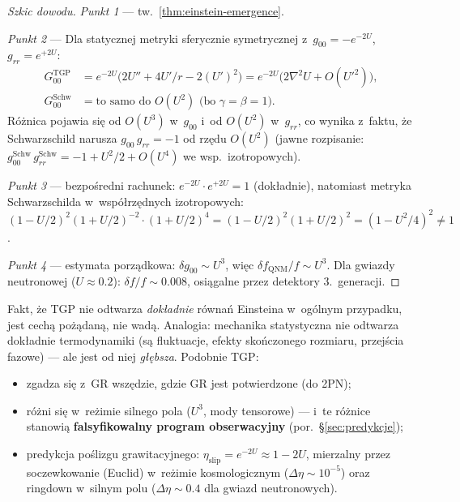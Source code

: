 \begin{proof}[Szkic dowodu]
\emph{Punkt 1} --- tw.~\ref{thm:einstein-emergence}.

\emph{Punkt 2} --- Dla statycznej metryki sferycznie symetrycznej
z~$g_{00} = -e^{-2U}$, $g_{rr} = e^{+2U}$:
\begin{align}
  G^{\mathrm{TGP}}_{00} &= e^{-2U}\bigl(2U'' + 4U'/r
    - 2(U')^2\bigr)
    = e^{-2U}\bigl(2\nabla^2 U + O(U'^2)\bigr),\\
  G^{\mathrm{Schw}}_{00} &= \text{to samo do }O(U^2)
    \text{ (bo }\gamma = \beta = 1\text{)}.
\end{align}
R\'o\.znica pojawia si\k{e} od $O(U^3)$ w~$g_{00}$ i~od $O(U^2)$
w~$g_{rr}$, co wynika z~faktu, \.ze Schwarzschild narusza
$g_{00}\,g_{rr} = -1$ od rz\k{e}du $O(U^2)$
(jawne rozpisanie:
$g^{\mathrm{Schw}}_{00}\,g^{\mathrm{Schw}}_{rr}
= -1 + U^2/2 + O(U^4)$ we wsp.\ izotropowych).

\emph{Punkt 3} --- bezpo\'sredni rachunek:
$e^{-2U}\cdot e^{+2U} = 1$ (dok\l{}adnie),
natomiast metryka Schwarzschilda w~wsp\'o\l{}rz\k{e}dnych
izotropowych: $(1-U/2)^2(1+U/2)^{-2} \cdot (1+U/2)^4
= (1-U/2)^2(1+U/2)^2 = (1-U^2/4)^2 \neq 1$.

\emph{Punkt 4} --- estymata porz\k{a}dkowa: $\delta g_{00}
\sim U^3$, wi\k{e}c $\delta f_{\mathrm{QNM}}/f \sim U^3$.
Dla gwiazdy neutronowej ($U \approx 0.2$):
$\delta f/f \sim 0.008$, osi\k{a}galne przez detektory
3.~generacji.
\end{proof}

\begin{remark}%
\label{rem:emergence-not-failure}
Fakt, \.ze TGP nie odtwarza \emph{dok\l{}adnie} r\'owna\'n
Einsteina w~og\'olnym przypadku, jest cech\k{a}
po\.z\k{a}dan\k{a}, nie wad\k{a}. Analogia: mechanika statystyczna
nie odtwarza dok\l{}adnie termodynamiki (s\k{a} fluktuacje,
efekty sko\'nczonego rozmiaru, przej\'scia fazowe) --- ale
jest od niej \emph{g\l{}\k{e}bsza}. Podobnie TGP:
\begin{itemize}[nosep]
  \item zgadza si\k{e} z~GR wsz\k{e}dzie, gdzie GR jest
    potwierdzone (do 2PN);
  \item r\'o\.zni si\k{e} w~re\.zimie silnego pola
    ($U^3$, mody tensorowe) --- i~te r\'o\.znice stanowi\k{a}
    \textbf{falsyfikowalny program obserwacyjny} (por.\ \S\ref{sec:predykcje});
  \item predykcja po\'slizgu grawitacyjnego:
    $\eta_{\mathrm{slip}} = e^{-2U} \approx 1 - 2U$,
    mierzalny przez soczewkowanie (Euclid) w~re\.zimie
    kosmologicznym ($\Delta\eta \sim 10^{-5}$) oraz
    ringdown w~silnym polu ($\Delta\eta \sim 0.4$
    dla gwiazd neutronowych).
\end{itemize}
\end{remark}

